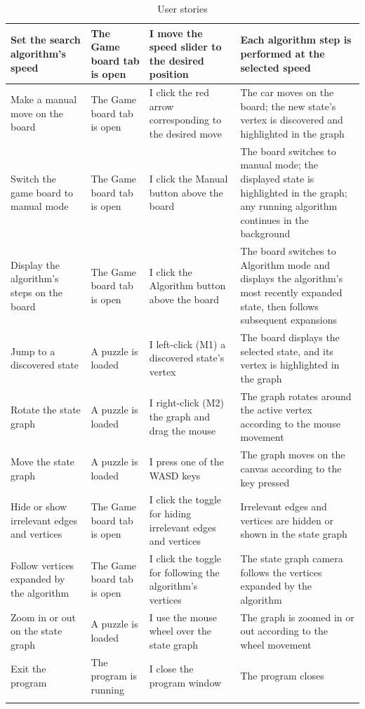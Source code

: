 \begin{center}
\begin{longtable}{ | P{0.22\storywidth} | P{0.22\storywidth} | P{0.22\storywidth} | P{0.34\storywidth} | }
Set the search algorithm's speed & The Game board tab is open & I move the speed slider to the desired position & Each algorithm step is performed at the selected speed \\ \hline
Make a manual move on the board & The Game board tab is open & I click the red arrow corresponding to the desired move & The car moves on the board; the new state's vertex is discovered and highlighted in the graph \\ \hline
Switch the game board to manual mode & The Game board tab is open & I click the Manual button above the board & The board switches to manual mode; the displayed state is highlighted in the graph; any running algorithm continues in the background \\ \hline
Display the algorithm's steps on the board & The Game board tab is open & I click the Algorithm button above the board & The board switches to Algorithm mode and displays the algorithm's most recently expanded state, then follows subsequent expansions \\ \hline
Jump to a discovered state & A puzzle is loaded & I left-click (M1) a discovered state's vertex & The board displays the selected state, and its vertex is highlighted in the graph \\ \hline
Rotate the state graph & A puzzle is loaded & I right-click (M2) the graph and drag the mouse & The graph rotates around the active vertex according to the mouse movement \\ \hline
Move the state graph & A puzzle is loaded & I press one of the WASD keys & The graph moves on the canvas according to the key pressed \\ \hline
Hide or show irrelevant edges and vertices & The Game board tab is open & I click the toggle for hiding irrelevant edges and vertices & Irrelevant edges and vertices are hidden or shown in the state graph \\ \hline
Follow vertices expanded by the algorithm & The Game board tab is open & I click the toggle for following the algorithm's vertices & The state graph camera follows the vertices expanded by the algorithm \\ \hline
Zoom in or out on the state graph & A puzzle is loaded & I use the mouse wheel over the state graph & The graph is zoomed in or out according to the wheel movement \\ \hline
Exit the program & The program is running & I close the program window & The program closes \\ \hline
\caption{User stories}
\label{tab:userstory}
\end{longtable}
\end{center}

